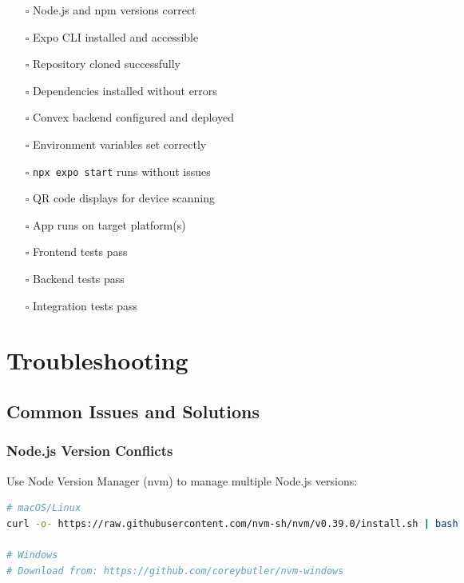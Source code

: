 \documentclass[a4paper,12pt]{article}
\begin{document}
\begin{tcolorbox}[colback=lightgray,colframe=black,title=\textbf{Installation Verification}]
\begin{itemize}[leftmargin=*]
    \item[$\square$] Node.js and npm versions correct
    \item[$\square$] Expo CLI installed and accessible
    \item[$\square$] Repository cloned successfully
    \item[$\square$] Dependencies installed without errors
    \item[$\square$] Convex backend configured and deployed
    \item[$\square$] Environment variables set correctly
    \item[$\square$] \texttt{npx expo start} runs without issues
    \item[$\square$] QR code displays for device scanning
    \item[$\square$] App runs on target platform(s)
    \item[$\square$] Frontend tests pass
    \item[$\square$] Backend tests pass
    \item[$\square$] Integration tests pass
\end{itemize}
\end{tcolorbox}

\section{Troubleshooting}

\subsection{Common Issues and Solutions}

\subsubsection{Node.js Version Conflicts}
Use Node Version Manager (nvm) to manage multiple Node.js versions:

\begin{lstlisting}[language=bash]
# macOS/Linux
curl -o- https://raw.githubusercontent.com/nvm-sh/nvm/v0.39.0/install.sh | bash

# Windows
# Download from: https://github.com/coreybutler/nvm-windows
\end{lstlisting}
\end{document}
